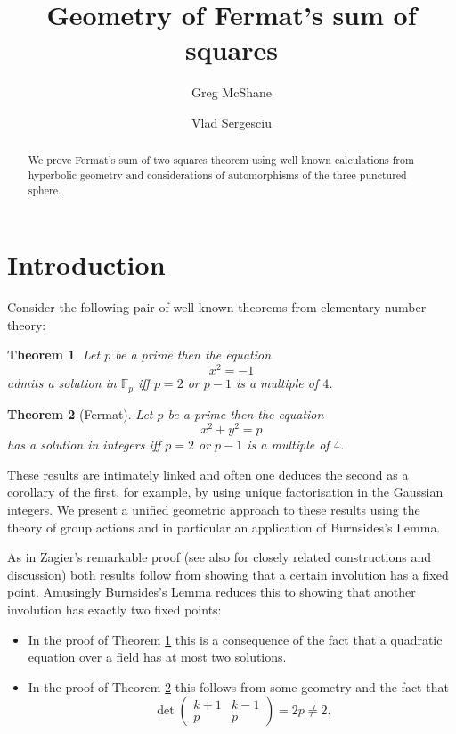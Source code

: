\documentclass[12pt,a4paper]{amsart}
\title{Geometry of Fermat's sum of squares}
\author[McShane]{Greg McShane}
\author[Vlad]{Vlad Sergesciu}
\newtheorem{thm}{Theorem}[section]
\def\fp{\mathbb{F}_p}
\begin{document}
\maketitle

\begin{abstract} 
We prove Fermat's sum  of two squares theorem 
using well known calculations from hyperbolic geometry 
and considerations of automorphisms of the three punctured sphere.
\end{abstract} 


\section{Introduction}

Consider the following pair of well known theorems from elementary number theory:


\begin{thm}\label{triv}
Let $p$ be a prime then the equation
$$x^2 = -1$$
admits a solution in $\fp$ iff 
$p =2$ or $p-1$ is a multiple of $4$.
\end{thm}


\begin{thm}[Fermat]\label{main}
Let $p$ be a prime then the equation
$$x^2 + y^2 = p $$
has a solution in integers  iff  $p =2$ or $p-1$ is a multiple of $4$.
\end{thm}

These results are intimately linked and often one deduces the second as a corollary of the first,
 for example, by using unique factorisation in the Gaussian integers.  We present a unified geometric  approach to these results  using the theory of group actions and in particular an application of Burnsides's Lemma. 
 
 
As in Zagier's remarkable proof \cite{zagier} 
(see also \cite{heath,north,aigner2,elsholtz} for closely related constructions and discussion)
both results follow from showing that a certain involution has a fixed point. Amusingly Burnsides's Lemma reduces this to showing that another involution has exactly two fixed points:
\begin{itemize}
\item  In the proof of Theorem \ref{triv} this is a consequence of the fact that a quadratic equation 
over a field has at most two solutions.
\item In the proof of Theorem \ref{main} this follows from some geometry and the fact that 
$$ \det 
\begin{pmatrix}
k + 1 & k- 1\\
p & p 
\end{pmatrix} = 2p \neq 2.
$$
 \end{itemize}
\end{document}
